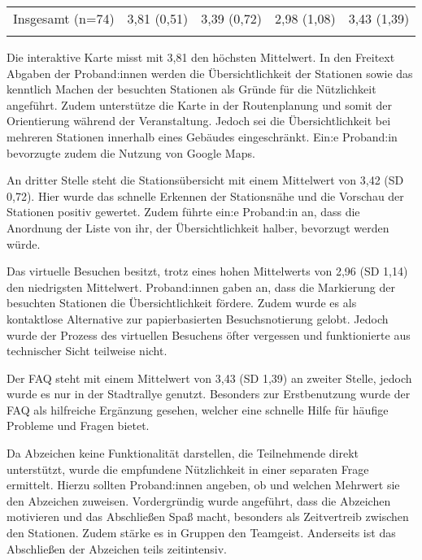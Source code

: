 \begin{table}[htpb]
\begin{tabularx}{\textwidth}{p{2.5cm}YYYY}
        \parbox[t][][t]{2.5cm}{Insgesamt (n=74)}                                & 3,81
        \linebreak (0,51)                                                              & 3,39
        \linebreak (0,72) & 2,98
        \linebreak (1,08) & 3,43
        \linebreak (1,39) \\
        \uzlhline
    \end{tabularx}
\end{table}

Die interaktive Karte misst mit 3,81 den höchsten Mittelwert. In den Freitext
Abgaben der Proband:innen werden die Übersichtlichkeit der Stationen sowie das
kenntlich Machen der besuchten Stationen als Gründe für die Nützlichkeit
angeführt. Zudem unterstütze die Karte in der Routenplanung und somit der
Orientierung während der Veranstaltung. Jedoch sei die Übersichtlichkeit bei
mehreren Stationen innerhalb eines Gebäudes eingeschränkt. Ein:e Proband:in
bevorzugte zudem die Nutzung von Google Maps.

An dritter Stelle steht die Stationsübersicht mit einem Mittelwert von 3,42 (SD
0,72). Hier wurde das schnelle Erkennen der Stationsnähe und die Vorschau der
Stationen positiv gewertet. Zudem führte ein:e Proband:in an, dass die Anordnung
der Liste von ihr, der Übersichtlichkeit halber, bevorzugt werden würde.

Das virtuelle Besuchen besitzt, trotz eines hohen Mittelwerts von 2,96 (SD 1,14)
den niedrigsten Mittelwert. Proband:innen gaben an, dass die Markierung der
besuchten Stationen die Übersichtlichkeit fördere. Zudem wurde es als
kontaktlose Alternative zur papierbasierten Besuchsnotierung gelobt. Jedoch
wurde der Prozess des virtuellen Besuchens öfter vergessen und funktionierte aus
technischer Sicht teilweise nicht.

Der FAQ steht mit einem Mittelwert von 3,43 (SD 1,39) an zweiter Stelle, jedoch
wurde es nur in der Stadtrallye genutzt. Besonders zur Erstbenutzung wurde der FAQ als hilfreiche Ergänzung gesehen, welcher eine schnelle Hilfe für häufige
Probleme und Fragen bietet.

Da Abzeichen keine Funktionalität darstellen, die Teilnehmende direkt
unterstützt, wurde die empfundene Nützlichkeit in einer separaten Frage
ermittelt. Hierzu sollten Proband:innen angeben, ob und welchen Mehrwert sie den
Abzeichen zuweisen. Vordergründig wurde angeführt, dass die Abzeichen motivieren
und das Abschließen Spaß macht, besonders als Zeitvertreib zwischen den
Stationen. Zudem stärke es in Gruppen den Teamgeist. Anderseits ist das
Abschließen der Abzeichen teils zeitintensiv.


